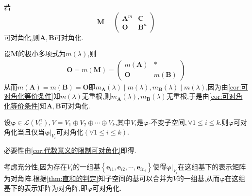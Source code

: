\begin{green}
\begin{corollary}[代数意义的限制可对角化]\label{cor:代数意义的限制可对角化}
    若\[
    \bm{M}=\begin{pmatrix}
        \bm{A}^m&\bm{C}\\
        \bm{O}&\bm{B}^n
    \end{pmatrix}
    \]可对角化,则$\bm{A},\bm{B}$可对角化.
\end{corollary}
\begin{Proof}
    设$\bm{M}$的极小多项式为$m\left(\lambda\right)$,则\begin{align*}
        \bm{O}=m\left(\bm{M}\right)=\begin{pmatrix}
            m\left(\bm{A}\right)&*\\
            \bm{O}&m\left(\bm{B}\right) 
        \end{pmatrix}
    \end{align*}从而$m\left(\bm{A}\right)=m\left(\bm{B}\right)=\bm{O}$即$m_{\bm{A}}\left(\lambda\right)\mid m\left(\lambda\right),m_{\bm{B}}\left(\lambda\right)\mid m\left(\lambda\right)$,因为由\cref{cor:可对角化等价条件}知$m\left(\lambda\right)$无重根,则$m_{\bm{A}}\left(\lambda\right),m_{\bm{B}}\left(\lambda\right)$无重根,于是由\cref{cor:可对角化等价条件}知$\bm{A},\bm{B}$可对角化.
\end{Proof}
\end{green}
\begin{green}
\begin{corollary}[多个限制可对角化]\label{cor:多个限制可对角化}
    设$\bm{\varphi}\in \mathcal{L}\left(
        V_{\mathbb{C}}^n
    \right),V=V_1\oplus V_2\oplus\cdots\oplus V_k$,其中$V_i$是$\bm{\varphi}$-不变子空间$,\forall 1\leqslant i\leqslant k.$则$\bm{\varphi}$可对角化当且仅当$\bm{\varphi}\Big|_{V_i}$可对角化$\left(\forall 1\leqslant i\leqslant k\right).$
\end{corollary}
\begin{Proof}
必要性由\cref{cor:代数意义的限制可对角化}即得.

考虑充分性,因为存在$V_i$的一组基$\left\{
    \bm{e}_{i1},\bm{e}_{i2},\cdots,\bm{e}_{in_i}
\right\}$使得$\bm{\varphi}\Big|_{V_i}$在这组基下的表示矩阵为对角阵.根据\cref{thm:直和的判定}知子空间的基可以合并为$V$的一组基,从而$\bm{\varphi}$在这组基下的表示矩阵为对角阵,即$\bm{\varphi}$可对角化.
\end{Proof}
\end{green}
